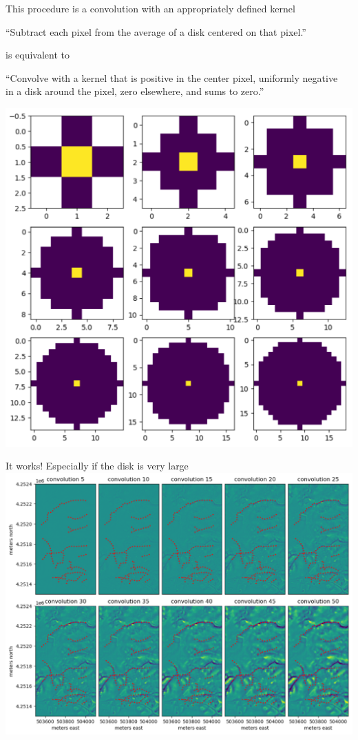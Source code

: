 \documentclass[aspectratio=169]{beamer}
\begin{document}
\begin{frame}{This procedure is a convolution with an appropriately defined kernel}
\vspace{0.15 cm}
\begin{center}
``Subtract each pixel from the average of a disk centered on that pixel.''

\vspace{0.25 cm}
is equivalent to

\vspace{0.25 cm}
``Convolve with a kernel that is positive in the center pixel, uniformly negative \\ in a disk around the pixel, zero elsewhere, and sums to zero.''

\vspace{0.35 cm}
\includegraphics[width=0.35\linewidth]{img/simple-kernels.png}
\end{center}
\end{frame}

\begin{frame}{It works! Especially if the disk is very large}
\vspace{0.15 cm}
\centering\includegraphics[width=0.75\linewidth]{img/first-convolution-results.png}
\end{frame}
\end{document}
